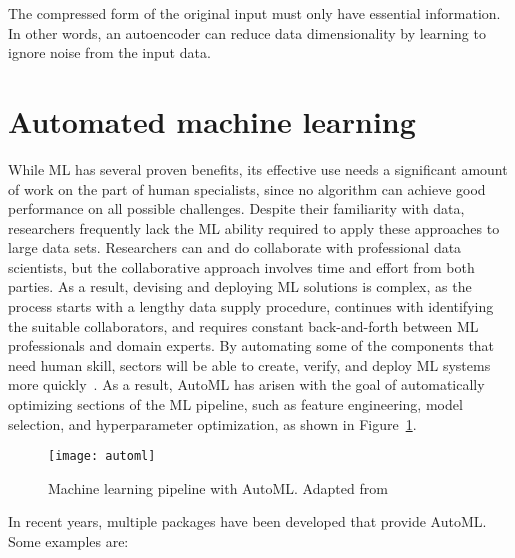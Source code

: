 The compressed form of the original input must only have essential information. In other words, an autoencoder can reduce data dimensionality by learning to ignore noise from the input data. 

\section{Automated machine learning}

While \gls{ML} has several proven benefits, its effective use needs a significant amount of work on the part of human specialists, since no algorithm can achieve good performance on all possible challenges. Despite their familiarity with data, researchers frequently lack the \gls{ML} ability required to apply these approaches to large data sets. Researchers can and do collaborate with professional data scientists, but the collaborative approach involves time and effort from both parties. As a result, devising and deploying \gls{ML} solutions is complex, as the process starts with a lengthy data supply procedure, continues with identifying the suitable collaborators, and requires constant back-and-forth between \gls{ML} professionals and domain experts. By automating some of the components that need human skill, sectors will be able to create, verify, and deploy \gls{ML} systems more quickly~\cite{Waring2020AutomatedHealthcare}. As a result, \gls{AutoML} has arisen with the goal of automatically optimizing sections of the \gls{ML} pipeline, such as feature engineering, model selection, and hyperparameter optimization, as shown in Figure~\ref{fig:automl}. 

\begin{figure}[htbp]
    \centering
    \texttt{[image: automl]}
    \caption{Machine learning pipeline with AutoML. Adapted from~\cite{Waring2020AutomatedHealthcare}}
    \label{fig:automl}
\end{figure}

In recent years, multiple packages have been developed that provide \gls{AutoML}. Some examples are:

